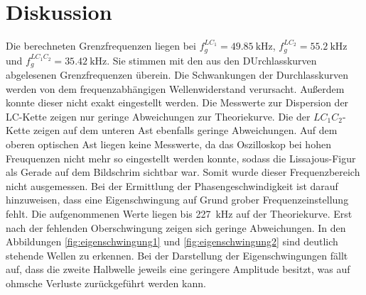 \section{Diskussion}
\label{sec:Diskussion}

Die berechneten Grenzfrequenzen liegen bei   $f_g^{LC_{1}} = \SI{49,85}{\kilo\hertz}$, $f_g^{LC_2} = \SI{55,2}{\kilo\hertz}$ und $f_g^{LC_1C_2} = \SI{35,42}{\kilo\hertz}$. Sie stimmen mit den aus den DUrchlasskurven abgelesenen Grenzfrequenzen überein.
Die Schwankungen der Durchlasskurven werden von dem frequenzabhängigen Wellenwiderstand verursacht. Außerdem konnte dieser nicht exakt eingestellt werden. Die Messwerte zur Dispersion der LC-Kette zeigen nur geringe Abweichungen zur Theoriekurve. Die der $LC_{1}C_{2}$-Kette zeigen auf dem unteren Ast ebenfalls geringe Abweichungen. Auf dem oberen optischen Ast liegen keine Messwerte, da das Oszilloskop bei hohen Freuquenzen nicht mehr so eingestellt werden konnte, sodass die Lissajous-Figur als Gerade auf dem Bildschrim sichtbar war. Somit wurde dieser Frequenzbereich nicht ausgemessen. Bei der Ermittlung der Phasengeschwindigkeit ist darauf hinzuweisen, dass eine Eigenschwingung auf Grund grober Frequenzeinstellung fehlt. Die aufgenommenen Werte liegen bis \SI{227}{\kilo\Hz} auf der Theoriekurve. Erst nach der fehlenden Oberschwingung zeigen sich geringe Abweichungen.
 In  den Abbildungen \ref{fig:eigenschwingung1} und \ref{fig:eigenschwingung2} sind deutlich stehende Wellen zu erkennen. Bei der Darstellung der Eigenschwingungen fällt auf, dass die zweite Halbwelle jeweils eine geringere Amplitude besitzt, was auf ohmsche Verluste zurückgeführt werden kann.
